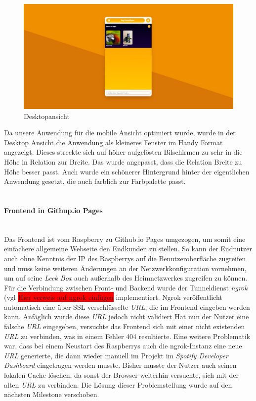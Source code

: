 \documentclass[10pt, a4paper]{article}
\begin{document}
\begin{onehalfspace}
\begin{figure}[ht]
  \includegraphics[width=\textwidth]{HomescreenDesktop.jpeg}
    \caption{Desktopansicht}
    \label{fig1}
\end{figure}
Da unsere Anwendung für die mobile Ansicht optimiert wurde, wurde in der Desktop Ansicht die Anwendung als kleineres Fenster im Handy Format angezeigt.
Dieses streckte sich auf höher aufgelösten Bilschirmen zu sehr in die Höhe in Relation zur Breite.
Das wurde angepasst, dass die Relation Breite zu Höhe besser passt.
Auch wurde ein schönerer Hintergrund hinter der eigentlichen Anwendung gesetzt, die auch farblich zur Farbpalette passt.
\\~\\
\paragraph*{Frontend in Githup.io Pages} $~$ \\
Das Frontend ist vom Raspberry zu Github.io Pages umgezogen, um somit eine einfachere allgemeine Webseite den Endkunden zu stellen.
So kann der Endnutzer auch ohne Kenntnis der IP des Raspberrys auf die Benutzeroberfläche zugreifen
und muss keine weiteren Änderungen an der Netzwerkkonfiguration vornehmen, um auf seine \textit{Leek Box} auch außerhalb des Heimnetzwerkes zugreifen zu können.
Für die Verbindung zwischen Front- und Backend wurde der Tunneldienst \textit{ngrok} (vgl \colorbox{red}{Hier verweis auf ngrok einfügen} implementiert.
Ngrok veröffentlicht automatisch eine über SSL verschlüsselte \textit{URL}, die im Frontend eingeben werden kann.
Anfäglich wurde diese \textit{URL} jedoch nicht validiert
Hat nun der Nutzer eine falsche \textit{URL} eingegeben, versuchte das Frontend sich mit einer nicht existenden \textit{URL} zu verbinden, was in einem Fehler 404 resultierte.
Eine weitere Problematik war, dass bei einem Neustart des Raspberrys auch die ngrok-Instanz eine neue \textit{URL} generierte, die dann wieder manuell im Projekt im \textit{Spotify Developer Dashboard} eingetragen werden musste.
Bisher musste der Nutzer auch seinen lokalen Cache löschen, da sonst der Browser weiterhin versuchte, sich mit der alten \textit{URL} zu verbinden.
Die Lösung dieser Problemstellung wurde auf den nächsten Milestone verschoben.
\\~\\

\end{onehalfspace}
\end{document}
